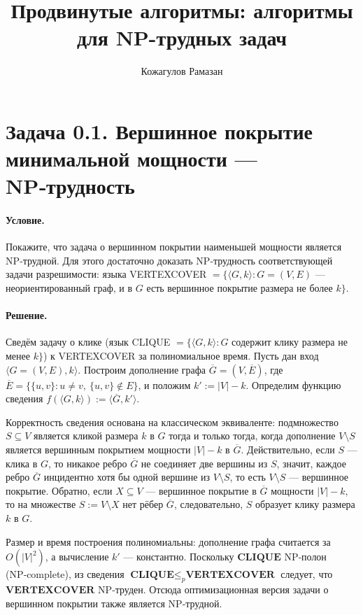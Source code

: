 \documentclass[12pt]{article}
\begin{document}
  \title{Продвинутые алгоритмы: алгоритмы для NP-трудных задач}
  \author{Кожагулов Рамазан}
  \date{}
  \maketitle


  \section*{Задача 0.1. Вершинное покрытие минимальной мощности — NP‑трудность}

  \paragraph{Условие.}
  Покажите, что задача о вершинном покрытии наименьшей мощности является NP‑трудной. Для этого достаточно доказать NP‑трудность соответствующей задачи разрешимости: языка VERTEXCOVER $= \{\langle G,k\rangle : G=(V,E)$ — неориентированный граф, и в $G$ есть вершинное покрытие размера не более $k\}$.

  \paragraph{Решение.}
  Сведём задачу о клике (язык CLIQUE $= \{\langle G,k\rangle : G$ содержит клику размера не менее $k\}$) к VERTEXCOVER за полиномиальное время. Пусть дан вход $\langle G=(V,E),k\rangle$. Построим дополнение графа $\overline{G}=(V,\overline{E})$, где $\overline{E}=\{\{u,v\} : u\neq v,\ \{u,v\}\notin E\}$, и положим $k' := |V|-k$. Определим функцию сведения $f(\langle G,k\rangle) := \langle \overline{G}, k'\rangle$.

  Корректность сведения основана на классическом эквиваленте: подмножество $S\subseteq V$ является кликой размера $k$ в $G$ тогда и только тогда, когда дополнение $V\setminus S$ является вершинным покрытием мощности $|V|-k$ в $\overline{G}$. Действительно, если $S$ — клика в $G$, то никакое ребро $\overline{G}$ не соединяет две вершины из $S$, значит, каждое ребро $\overline{G}$ инцидентно хотя бы одной вершине из $V\setminus S$, то есть $V\setminus S$ — вершинное покрытие. Обратно, если $X\subseteq V$ — вершинное покрытие в $\overline{G}$ мощности $|V|-k$, то на множестве $S:=V\setminus X$ нет рёбер $\overline{G}$, следовательно, $S$ образует клику размера $k$ в $G$.

  Размер и время построения полиномиальны: дополнение графа считается за $O(|V|^2)$, а вычисление $k'$ — константно. Поскольку $\textbf{CLIQUE}$ NP‑полон (NP‑complete), из сведения $\textbf{CLIQUE} \leq_p \textbf{VERTEXCOVER}$ следует, что $\textbf{VERTEXCOVER}$ NP‑труден. Отсюда оптимизационная версия задачи о вершинном покрытии также является NP‑трудной.
\end{document}
